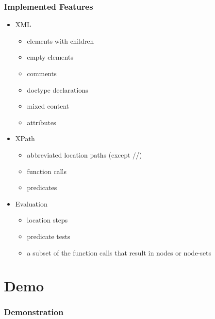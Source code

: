 \documentclass{beamer}
\begin{document}
\begin{frame}
\frametitle{Implemented Features}

\begin{itemize}
\item XML
	\begin{itemize}
	\item elements with children
	\item empty elements
	\item comments
	\item doctype declarations
	\item mixed content
	\item attributes
	\end{itemize}
\pause
\item XPath
	\begin{itemize}
	\item 	abbreviated location paths (except  //)
	\item function calls
	\item predicates
	\end{itemize}
\pause
\item Evaluation
\begin{itemize}
	\item location steps
	\item predicate tests
	\item a subset of the function calls that result in nodes or node-sets
	\end{itemize}
\end{itemize}
\end{frame}

\section{Demo}
\begin{frame}
\frametitle{Demonstration}

\end{frame}
\end{document}
